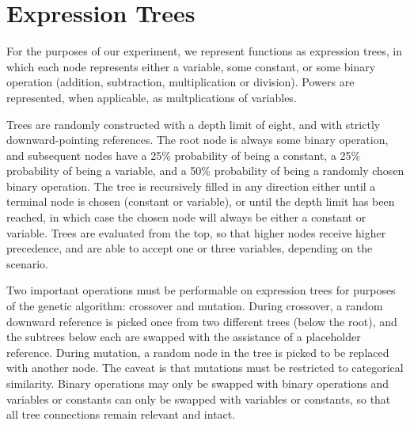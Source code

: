 
\section{Expression Trees}
\label{sec:background}

For the purposes of our experiment, we represent functions as expression
trees, in which each node represents either a variable, some constant, or
some binary operation (addition, subtraction, multiplication or division). Powers
are represented, when applicable, as multplications of variables.

Trees are randomly constructed with a depth limit of eight, and with strictly
downward-pointing references. The root node is always some binary operation,
and subsequent nodes have a 25$\%$ probability of being a constant, a 25$\%$ probability
of being a variable, and a 50$\%$ probability of being a randomly chosen binary operation. The tree is
recursively filled in any direction either until a terminal node is chosen (constant or variable),
or until the depth limit has been reached, in which case the chosen node will always
be either a constant or variable. Trees are evaluated from the top, so that higher nodes
receive higher precedence, and are able to accept one or three variables, depending
on the scenario.

Two important operations must be performable on expression trees for purposes of the
genetic algorithm: crossover and mutation. During crossover, a random downward reference
is picked once from two different trees (below the root), and the subtrees below each are
swapped with the assistance of a placeholder reference. During mutation, a random node in
the tree is picked to be replaced with another node. The caveat is that mutations must
be restricted to categorical similarity. Binary operations may only be swapped with binary
operations and variables or constants can only be swapped with variables or constants, so
that all tree connections remain relevant and intact.